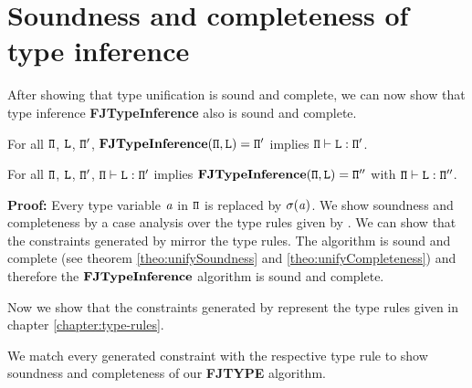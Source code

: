 \section{Soundness and completeness of type inference}
\label{sec:soundn-compl-type}

After showing that type unification is sound and complete, we
can now show that type inference \textbf{FJTypeInference} also is
sound and complete.
\begin{theorem}[Soundness] For all ${\tt \Pi}$, ${\tt L}$, ${\tt \Pi'}$, 
  $\textbf{FJTypeInference}({\tt \Pi},\texttt{L}) = {\tt \Pi}'$ implies ${\tt \Pi} \vdash \texttt{L} : {\tt \Pi}'$.
\end{theorem}
\begin{theorem}[Completeness]  For all ${\tt \Pi}$, ${\tt L}$, ${\tt \Pi'}$,
  ${\tt \Pi} \vdash \texttt{L} : {\tt \Pi}'$ implies $\textbf{FJTypeInference}({\tt \Pi},\texttt{L}) = {\tt \Pi}''$ with ${\tt \Pi} \vdash \texttt{L} : {\tt \Pi}''$.
\end{theorem}
\textbf{Proof:}
Every type variable $\mathit{ a }$ in ${\tt \Pi}$ is replaced by $\sigma(\mathit{ a })$.
We show soundness and completeness by a case analysis over the type rules given by \TFGJ{}.
We can show that the constraints generated by \fjtype{} mirror the \TFGJ{} type rules.
The \unify{} algorithm is sound and complete (see theorem \ref{theo:unifySoundness} and \ref{theo:unifyCompleteness})
and therefore the $\textbf{FJTypeInference}$ algorithm is sound and complete.

Now we show that the constraints generated by {\fjtype{}}
represent the type rules given in chapter \ref{chapter:type-rules}.



We match every generated constraint with the respective type rule to show soundness and completeness of our \textbf{FJTYPE} algorithm.

